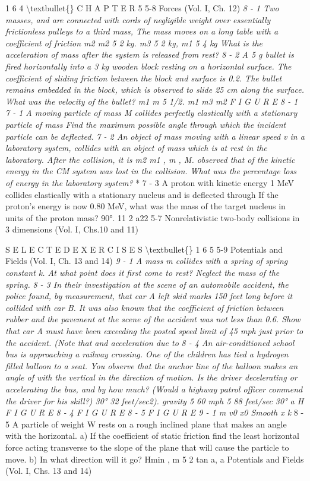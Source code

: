 \documentclass[10pt,oneside]{article}
\begin{document}
1 6 4 \textbackslash{}textbullet\{\} C H A P T E R  5 5-8 Forces (Vol. I, Ch. 12) \emph{ 8 - 1 Two masses, and are connected with cords of negligible weight over essentially frictionless pulleys to a third mass, The mass moves on a long table with a coefficient of friction m2 m2 5 2 kg. m3 5 2 kg, m1 5 4 kg What is the acceleration of mass after the system is released from rest? } \emph{ 8 - 2 A 5 g bullet is fired horizontally into a 3 kg wooden block resting on a horizontal surface. The coefficient of sliding friction between the block and surface is 0.2. The bullet remains embedded in the block, which is observed to slide 25 cm along the surface. What was the velocity of the bullet? m1 m 5 1/2. m1 m3 m2 F I G U R E  8 - 1 } \emph{ 7 - 1 A moving particle of mass M collides perfectly elastically with a stationary particle of mass Find the maximum possible angle through which the incident particle can be deflected. } \emph{ 7 - 2 An object of mass moving with a linear speed v in a laboratory system, collides with an object of mass which is at rest in the laboratory. After the collision, it is m2 m1 , m , M. observed that of the kinetic energy in the CM system was lost in the collision. What was the percentage loss of energy in the laboratory system? } * 7 - 3 A proton with kinetic energy 1 MeV collides elastically with a stationary nucleus and is deflected through If the proton’s energy is now 0.80 MeV, what was the mass of the target nucleus in units of the proton mass? 90°. 11 2 a22 5-7 Nonrelativistic two-body collisions in 3 dimensions (Vol. I, Chs.10 and 11)\par

S E L E C T E D  E X E R C I S E S \textbackslash{}textbullet\{\} 1 6 5 5-9 Potentials and Fields (Vol. I, Ch. 13 and 14) \emph{ 9 - 1 A mass m collides with a spring of spring constant k. At what point does it first come to rest? Neglect the mass of the spring. } \emph{ 8 - 3 In their investigation at the scene of an automobile accident, the police found, by measurement, that car A left skid marks 150 feet long before it collided with car B. It was also known that the coefficient of friction between rubber and the pavement at the scene of the accident was not less than 0.6. Show that car A must have been exceeding the posted speed limit of 45 mph just prior to the accident. (Note that and acceleration due to } \emph{ 8 - 4 An air-conditioned school bus is approaching a railway crossing. One of the children has tied a hydrogen filled balloon to a seat. You observe that the anchor line of the balloon makes an angle of with the vertical in the direction of motion. Is the driver decelerating or accelerating the bus, and by how much? (Would a highway patrol officer commend the driver for his skill?) 30° 32 feet/sec2). gravity 5 60 mph 5 88 feet/sec 30° a H F I G U R E  8 - 4 F I G U R E  8 - 5 F I G U R E  9 - 1 m v0 x0 Smooth x k } \emph{ } 8 - 5 A particle of weight W rests on a rough inclined plane that makes an angle with the horizontal. a) If the coefficient of static friction find the least horizontal force acting transverse to the slope of the plane that will cause the particle to move. b) In what direction will it go? Hmin , m 5 2 tan a, a Potentials and Fields (Vol. I, Chs. 13 and 14)\par
\end{document}
